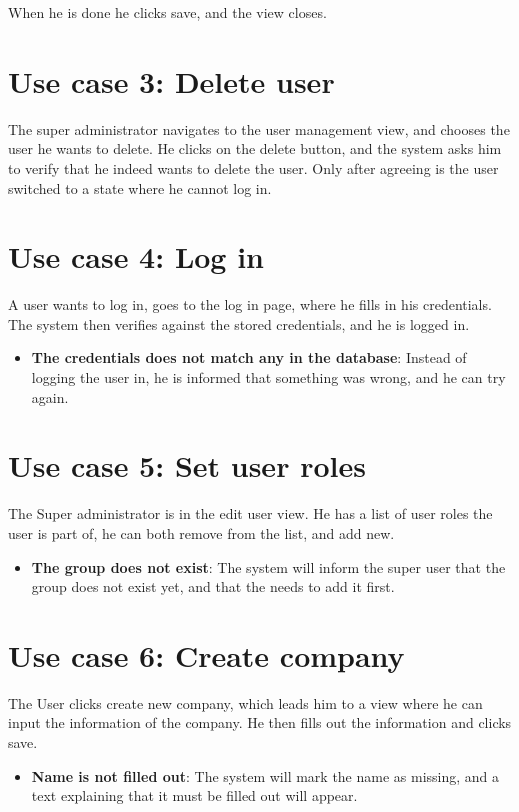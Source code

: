 When he is done he clicks save, and the view closes. 

\section{Use case 3: Delete user }
The super administrator navigates to the user management view, and chooses the
user he wants to delete. He clicks on the delete button, and the system asks him
to verify that he indeed wants to delete the user. Only after agreeing is the
user switched to a state where he cannot log in. 

\section{Use case 4: Log in }
A user wants to log in, goes to the log in page, where he fills in his
credentials. The system then verifies against the stored credentials, and he is
logged in. 
\begin{itemize}
  \item \textbf{The credentials does not match any in the database}: Instead of
    logging the user in, he is informed that something was wrong, and he can try
    again. 
\end{itemize}

\section{Use case 5: Set user roles }
The Super administrator is in the edit user view. He has a list of user roles
the user is part of, he can both remove from the list, and add new. 

\begin{itemize}
  \item \textbf{The group does not exist}: The system will inform the super user
    that the group does not exist yet, and that the needs to add it first. 
\end{itemize}

\section{Use case 6: Create company }
The User clicks create new company, which leads him to a view where he can input
the information of the company. He then fills out the information and clicks
save. 
\begin{itemize}
  \item \textbf{Name is not filled out}: The system will mark the name as
    missing, and a text explaining that it must be filled out will appear. 
\end{itemize}

